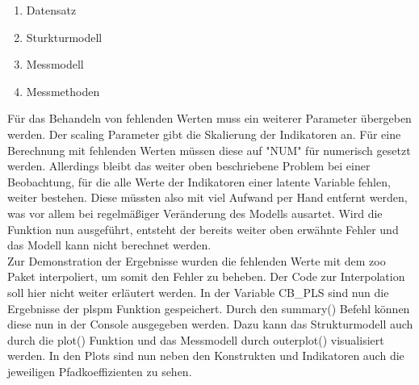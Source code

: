 \documentclass{article}\usepackage[]{graphicx}\usepackage[]{color}
\begin{document}
\begin{enumerate}
    \item Datensatz
    \item Sturkturmodell
    \item Messmodell
    \item Messmethoden
\end{enumerate}
Für das Behandeln von fehlenden Werten muss ein weiterer Parameter übergeben werden. Der scaling Parameter gibt die Skalierung der Indikatoren an. Für eine Berechnung mit fehlenden Werten müssen diese auf "NUM" für numerisch gesetzt werden. Allerdings bleibt das weiter oben beschriebene Problem bei einer Beobachtung, für die alle Werte der Indikatoren einer latente Variable fehlen, weiter bestehen. Diese müssten also mit viel Aufwand per Hand entfernt werden, was vor allem bei regelmäßiger Veränderung des Modells ausartet. Wird die Funktion nun ausgeführt, entsteht der bereits weiter oben erwähnte Fehler und das Modell kann nicht berechnet werden.\\
Zur Demonstration der Ergebnisse wurden die fehlenden Werte mit dem zoo Paket interpoliert, um somit den Fehler zu beheben. Der Code zur Interpolation soll hier nicht weiter erläutert werden. In der Variable CB\_PLS sind nun die Ergebnisse der plspm Funktion gespeichert. Durch den summary() Befehl können diese nun in der Console ausgegeben werden. Dazu kann das Strukturmodell auch durch die plot() Funktion und das Messmodell durch outerplot() visualisiert werden. In den Plots sind nun neben den Konstrukten und Indikatoren auch die jeweiligen Pfadkoeffizienten zu sehen.
\end{document}
